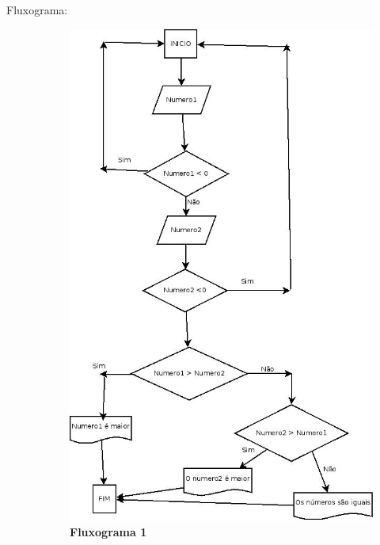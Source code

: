 \documentclass[a4paper, 12pt]{article}
\begin{document}
\begin{enumerate}
\begin{description}
      \item[Fluxograma:]
         \begin{figure}[H]
         \centering
         \includegraphics[width=1\textwidth]{fluxograma1}
         \caption[Fluxograma 1]{\textbf{Fluxograma 1}}
         \end{figure}
         

\end{description}
\end{enumerate}
\end{document}
